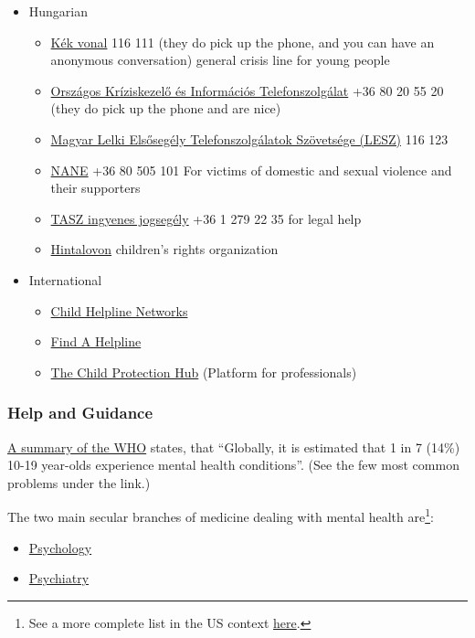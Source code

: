 \documentclass{article}
\begin{document}
\begin{itemize}
\item Hungarian
\begin{itemize}
    \item \href{https://kek-vonal.hu/}{Kék vonal} 116 111 (they do pick up the phone, and you can have an anonymous conversation) general crisis line for young people
    \item \href{https://okit.hu/}{Országos Kríziskezelő és Információs Telefonszolgálat} +36 80 20 55 20 (they do pick up the phone and are nice)
    \item \href{https://sos116-123.hu/}{Magyar Lelki Elsősegély Telefonszolgálatok
Szövetsége (LESZ)} 116 123
    \item \href{https://nane.hu/}{NANE} +36 80 505 101 For victims of domestic and sexual violence and their supporters
    \item \href{https://tasz.hu/ingyenes-jogsegelyszolgalat}{TASZ ingyenes jogsegély} +36 1 279 22 35 for legal help
    \item \href{https://hintalovon.hu/}{Hintalovon} children’s rights organization
\end{itemize}

\item International
\begin{itemize}
\item \href{https://www.childhelplineinternational.org/child-helplines/child-helpline-network/}{Child Helpline Networks}
\item \href{https://findahelpline.com/}{Find A Helpline}
\item \href{https://childhub.org/en}{The Child Protection Hub} (Platform for professionals)
\end{itemize}
\end{itemize}

\subsubsection{Help and Guidance}

\href{https://www.who.int/news-room/fact-sheets/detail/adolescent-mental-health}{A summary of the WHO} states, that ``Globally, it is estimated that 1 in 7 (14\%) 10-19 year-olds experience mental health conditions''. (See the few most common problems under the link.)

The two main secular branches of medicine dealing with mental health are\footnote{See a more complete list in the US context \href{https://www.healthline.com/health/mental-health-professionals-types}{here}.}:
\begin{itemize}
    \item \href{https://en.wikipedia.org/wiki/Clinical_psychology}{Psychology}
    \item \href{https://www.healthline.com/health/mental-health/what-is-the-difference-between-a-psychologist-and-a-psychiatrist}{Psychiatry}
\end{itemize}
\end{document}
